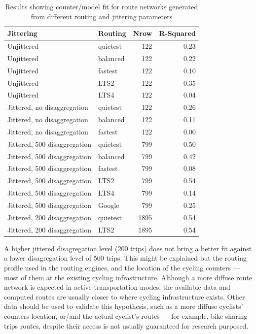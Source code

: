 \documentclass{isprs} %
\begin{document}
\begin{table}

\caption{\label{tab:unnamed-chunk-10}\label{tableresults}Results showing counter/model fit for route networks generated from different routing and jittering parameters}
\centering
\begin{tabular}[t]{llrr}
\toprule
Jittering & Routing & Nrow & R-Squared\\
\midrule
Unjittered & quietest & 122 & 0.23\\
Unjittered & balanced & 122 & 0.22\\
Unjittered & fastest & 122 & 0.10\\
Unjittered & LTS2 & 122 & 0.35\\
Unjittered & LTS4 & 122 & 0.04\\
\addlinespace
Jittered, no disaggregation & quietest & 122 & 0.26\\
Jittered, no disaggregation & balanced & 122 & 0.11\\
Jittered, no disaggregation & fastest & 122 & 0.00\\
\addlinespace
Jittered, 500 disaggregation & quietest & 799 & 0.50\\
Jittered, 500 disaggregation & balanced & 799 & 0.42\\
Jittered, 500 disaggregation & fastest & 799 & 0.08\\
Jittered, 500 disaggregation & LTS2 & 799 & 0.54\\
Jittered, 500 disaggregation & LTS4 & 799 & 0.14\\
Jittered, 500 disaggregation & Google & 799 & 0.25\\
\addlinespace
Jittered, 200 disaggregation & quietest & 1895 & 0.54\\
Jittered, 200 disaggregation & LTS2 & 1895 & 0.54\\
\bottomrule
\end{tabular}
\end{table}

A higher jittered disagregation level (200 trips) does not bring a better fit against a lower disagregation level of 500 trips. This might be explained but the routing profile used in the routing engines, and the location of the cycling counters --- most of them at the existing cycling infrastructure.
Although a more diffuse route network is expected in active transportation modes, the available data and computed routes are usually closer to where cycling infrastructure exists. Other data should be used to validate this hypothesis, such as a more diffuse cyclists' counters location, or/and the actual cyclist's routes --- for example, bike sharing trips routes, despite their access is not usually guaranteed for research purposed.
\end{document}
